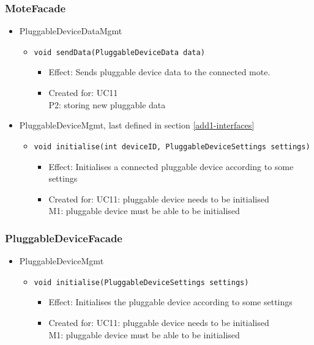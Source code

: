     \subsubsection{MoteFacade}
        \begin{itemize}
            \item PluggableDeviceDataMgmt
            \begin{itemize}
                \item \texttt{void sendData(PluggableDeviceData data)}
                \begin{itemize}
                    \item Effect: Sends pluggable device data to the connected mote.
                    \item Created for: UC11 \\
                          P2: storing new pluggable data
                \end{itemize}
            \end{itemize}

            \item PluggableDeviceMgmt, last defined in section \ref{add1-interfaces}
            \begin{itemize}
                \item \texttt{void initialise(int deviceID, PluggableDeviceSettings settings)}
                \begin{itemize}
                    \item Effect: Initialises a connected pluggable device according to some settings
                    \item Created for: UC11: pluggable device needs to be initialised \\
                          M1: pluggable device must be able to be initialised
                \end{itemize}
            \end{itemize}
        \end{itemize}

    \subsubsection{PluggableDeviceFacade}
        \begin{itemize}
        	\item PluggableDeviceMgmt
        	\begin{itemize}
                \item \texttt{void initialise(PluggableDeviceSettings settings)}
                \begin{itemize}
                    \item Effect: Initialises the pluggable device according to some settings
                    \item Created for: UC11: pluggable device needs to be initialised \\
                          M1: pluggable device must be able to be initialised
                \end{itemize}
        	\end{itemize}
        \end{itemize}

